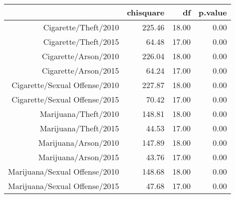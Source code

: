 \begin{table}[ht]
\centering
\begin{tabular}{rrrr}
  \hline
 & chisquare & df & p.value \\ 
  \hline
Cigarette/Theft/2010 & 225.46 & 18.00 & 0.00 \\ 
  Cigarette/Theft/2015 & 64.48 & 17.00 & 0.00 \\ 
  Cigarette/Arson/2010 & 226.04 & 18.00 & 0.00 \\ 
  Cigarette/Arson/2015 & 64.24 & 17.00 & 0.00 \\ 
  Cigarette/Sexual Offense/2010 & 227.87 & 18.00 & 0.00 \\ 
  Cigarette/Sexual Offense/2015 & 70.42 & 17.00 & 0.00 \\ 
  Marijuana/Theft/2010 & 148.81 & 18.00 & 0.00 \\ 
  Marijuana/Theft/2015 & 44.53 & 17.00 & 0.00 \\ 
  Marijuana/Arson/2010 & 147.89 & 18.00 & 0.00 \\ 
  Marijuana/Arson/2015 & 43.76 & 17.00 & 0.00 \\ 
  Marijuana/Sexual Offense/2010 & 148.68 & 18.00 & 0.00 \\ 
  Marijuana/Sexual Offense/2015 & 47.68 & 17.00 & 0.00 \\ 
   \hline
\end{tabular}
\end{table}

